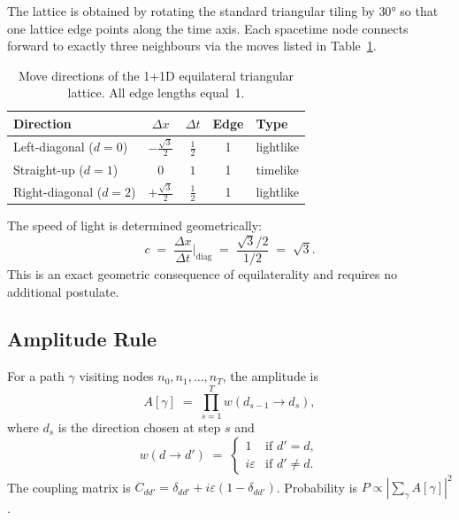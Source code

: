 \documentclass[twocolumn,showpacs,preprintnumbers,amsmath,amssymb]{revtex4-2}
\newcommand{\eps}{\varepsilon}
\newcommand{\sqh}{\frac{\sqrt{3}}{2}}
\begin{document}
The lattice is obtained by rotating the standard triangular tiling by $30°$
so that one lattice edge points along the time axis.
Each spacetime node connects forward to exactly three neighbours via the moves
listed in Table~\ref{tab:moves1d}.

\begin{table}[b]
\caption{Move directions of the 1+1D equilateral triangular lattice.
All edge lengths equal~1.}
\label{tab:moves1d}
\begin{ruledtabular}
\begin{tabular}{lcccl}
Direction & $\Delta x$ & $\Delta t$ & Edge & Type \\
\hline
Left-diagonal  ($d=0$) & $-\sqh$ & $\tfrac{1}{2}$ & 1 & lightlike \\
Straight-up    ($d=1$) & $0$              & $1$            & 1 & timelike  \\
Right-diagonal ($d=2$) & $+\sqh$ & $\tfrac{1}{2}$ & 1 & lightlike \\
\end{tabular}
\end{ruledtabular}
\end{table}

The speed of light is determined geometrically:
\begin{equation}
  c \;=\; \frac{\Delta x}{\Delta t}\bigg|_{\mathrm{diag}}
    \;=\; \frac{\sqrt{3}/2}{1/2} \;=\; \sqrt{3}.
  \label{eq:c}
\end{equation}
This is an exact geometric consequence of equilaterality and requires no
additional postulate.

\subsection{Amplitude Rule}

For a path $\gamma$ visiting nodes $n_0, n_1, \ldots, n_T$, the amplitude is
\begin{equation}
  A[\gamma] \;=\; \prod_{s=1}^{T} w(d_{s-1} \to d_s),
  \label{eq:amplitude_rule}
\end{equation}
where $d_s$ is the direction chosen at step $s$ and
\begin{equation}
  w(d \to d') \;=\;
  \begin{cases}
    1    & \text{if } d' = d, \\
    i\eps & \text{if } d' \ne d.
  \end{cases}
  \label{eq:w}
\end{equation}
The coupling matrix is $C_{dd'} = \delta_{dd'} + i\eps(1 - \delta_{dd'})$.
Probability is $P \propto |{\sum_\gamma A[\gamma]}|^2$.
\end{document}
